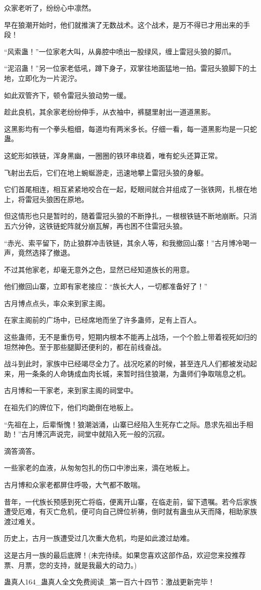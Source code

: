 \begin{this_body}
众家老听了，纷纷心中凛然。

早在狼潮开始时，他们就推演了无数战术。这个战术，是万不得已才用出来的手段！

“风索蛊！”一位家老大叫，从鼻腔中喷出一股绿风，缠上雷冠头狼的脚爪。

“泥沼蛊！”另一位家老低吼，蹲下身子，双掌往地面猛地一拍。雷冠头狼脚下的土地，立即化为一片泥泞。

如此双管齐下，顿令雷冠头狼动势一缓。

趁此良机，其余家老纷纷伸手，从衣袖中，裤腿里射出一道道黑影。

这黑影均有一个拳头粗细，每道均有两米多长。仔细一看，每一道黑影均是一只蛇蛊。

这蛇形如铁链，浑身黑幽，一圈圈的铁环串绕着，唯有蛇头还算正常。

飞射出去后，它们在地上蜿蜒游走，迅速地攀上雷冠头狼的身躯。

它们首尾相连，相互紧紧地咬合在一起，眨眼间就合并组成了一张铁网，扎根在地上，将雷冠头狼困在原地。

但这情形也只是暂时的，随着雷冠头狼的不断挣扎，一根根铁链不断地崩断。只消五六分钟，这铁链蛇阵就分崩瓦解，再也困不住雷冠头狼。

“赤光、索平留下，防止狼群冲击铁链，其余人等，和我撤回山寨！”古月博冷喝一声，竟然选择了撤退。

不过其他家老，却毫无意外之色，显然已经知道族长的用意。

他们撤回山寨，立即有家老接应：“族长大人，一切都准备好了！”

古月博点点头，率众来到家主阁。

在家主阁前的广场中，已经席地而坐了许多蛊师，足有上百人。

这些蛊师，无不是重伤号，短期内根本不能再上战场，一个个脸上带着视死如归的坦然神色。至于那些腿脚还便利的，都在前线奋战。

战斗到此时，家族中已经竭尽全力了。战况吃紧的时候，甚至连凡人们都被发动起来，用一条条的人命铸成血肉长城，来暂时挡住狼潮，为蛊师们争取喘息之机。

古月博和一干家老，来到家主阁的祠堂中。

在祖先们的牌位下，他们均跪倒在地板上。

“先祖在上，后辈惭愧！狼潮汹涌，山寨已经陷入生死存亡之际。恳求先祖出手相助！”古月博沉声说完，祠堂中就陷入死一般的沉寂。

滴答滴答。

一些家老的血液，从匆匆包扎的伤口中渗出来，滴在地板上。

古月博和众家老都屏住呼吸，大气都不敢喘。

昔年，一代族长预感到死亡将临，便离开山寨，在临走前，留下遗嘱。若今后家族遭受厄难，有灭亡危机，便可向自己牌位祈祷，倒时就有蛊虫从天而降，相助家族渡过难关。

历史上，古月一族遭受过几次重大危机，均是如此渡过劫难。

这是古月一族的最后底牌！(未完待续。如果您喜欢这部作品，欢迎您来投推荐票、月票，您的支持，就是我最大的动力。)

蛊真人164\_蛊真人全文免费阅读\_第一百六十四节：激战更新完毕！

\end{this_body}

